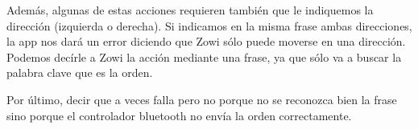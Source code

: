 \documentclass[10pt,a4paper,spanish]{article}
\begin{document}
Además, algunas de estas acciones requieren también que le indiquemos la dirección (izquierda o derecha). Si indicamos en la misma frase ambas direcciones, la app nos dará un error diciendo que Zowi sólo puede moverse en una dirección. Podemos decírle a Zowi la acción mediante una frase, ya que sólo va a buscar la palabra clave que es la orden.

Por último, decir que a veces falla pero no porque no se reconozca bien la frase sino porque el controlador bluetooth no envía la orden correctamente.
\end{document}

